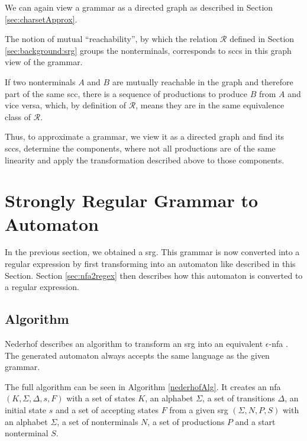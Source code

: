 We can again view a grammar as a directed graph as described in Section \ref{sec:charsetApprox}.

The notion of mutual \enquote{reachability}, by which the relation $\mathcal{R}$ defined in Section \ref{sec:background:srg} groups the nonterminals, corresponds to \acp{scc} in this graph view of the grammar.

If two nonterminals $A$ and $B$ are mutually reachable in the graph and therefore part of the same \ac{scc}, there is a sequence of productions to produce $B$ from $A$ and vice versa, which, by definition of $\mathcal{R}$, means they are in the same equivalence class of $\mathcal{R}$.

Thus, to approximate a grammar, we view it as a directed graph and find its \acp{scc}, determine the components, where not all productions are of the same linearity and apply the transformation described above to those components.

\begin{comment}

	
	Since a \ac{srg} generates a regular language and both steps in the transformation to a regular expression create an equivalent output from their input, the resulting regular expression accepts the language generated by the original \ac{srg}.
\end{comment}


\section{Strongly Regular Grammar to Automaton}\label{sec:nederhofAlgorithm}

In the previous section, we obtained a \acl{srg}. This grammar is now converted into a regular expression by first transforming into an automaton like described in this Section. Section \ref{sec:nfa2regex} then describes how this automaton is converted to a regular expression.

\subsection{Algorithm}

Nederhof describes an algorithm to transform an \ac{srg} into an equivalent $\epsilon$-\ac{nfa} \cite{nederhof}. The generated automaton always accepts the same language as the given grammar.

The full algorithm can be seen in Algorithm \ref{nederhofAlg}. It creates an \ac{nfa} $(K,\Sigma, \Delta, s, F)$ with a set of states $K$, an alphabet $\Sigma$, a set of transitions $\Delta$, an initial state $s$ and a set of accepting states $F$ from a given \ac{srg} $(\Sigma, N, P, S)$ with an alphabet $\Sigma$, a set of nonterminals $N$,  a set of productions $P$ and a start nonterminal $S$.

